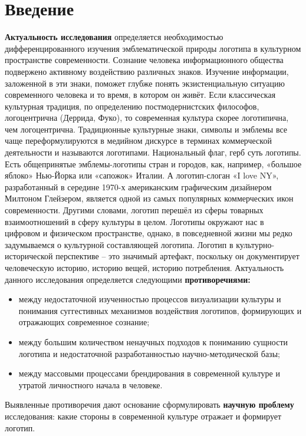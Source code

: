 \section{Введение}

\textbf{Актуальность исследования} определяется необходимостью дифференцированного изучения эмблематической природы логотипа в культурном пространстве современности. Сознание человека информационного общества подвержено активному воздействию различных знаков. Изучение информации, заложенной в эти знаки, поможет глубже понять экзистенциальную ситуацию современного человека и то время, в котором он живёт. Если классическая культурная традиция, по определению постмодернистских философов, логоцентрична (Деррида, Фуко), то современная культура скорее логотипична, чем логоцентрична. Традиционные культурные знаки, символы и эмблемы все чаще переформулируются в медийном дискурсе в терминах коммерческой деятельности и называются логотипами. Национальный флаг, герб суть логотипы. Есть общепринятые эмблемы-логотипы стран и городов, как, например, «большое яблоко» Нью-Йорка или «сапожок» Италии. А логотип-слоган «I love NY», разработанный в середине 1970-х американским графическим дизайнером Милтоном Глейзером, является одной из самых популярных коммерческих икон современности. Другими словами, логотип перешёл из сферы товарных взаимоотношений в сферу культуры в целом. Логотипы окружают нас в цифровом и физическом пространстве, однако, в повседневной жизни мы редко задумываемся о культурной составляющей логотипа. Логотип в культурно-исторической перспективе – это значимый артефакт, поскольку он документирует человеческую историю, историю вещей, историю потребления.
Актуальность данного исследования определяется следующими \textbf{противоречиями:}
\begin{itemize}
\item между недостаточной изученностью процессов визуализации культуры и понимания суггестивных механизмов воздействия логотипов, формирующих и отражающих современное сознание;
\item между большим количеством ненаучных подходов к пониманию сущности логотипа и недостаточной разработанностью научно-методической базы;
\item между массовыми процессами брендирования в современной культуре и утратой личностного начала в человеке.
\end{itemize}
Выявленные противоречия дают основание сформулировать \textbf{научную проблему} исследования: какие стороны в современной культуре отражает и формирует логотип.

